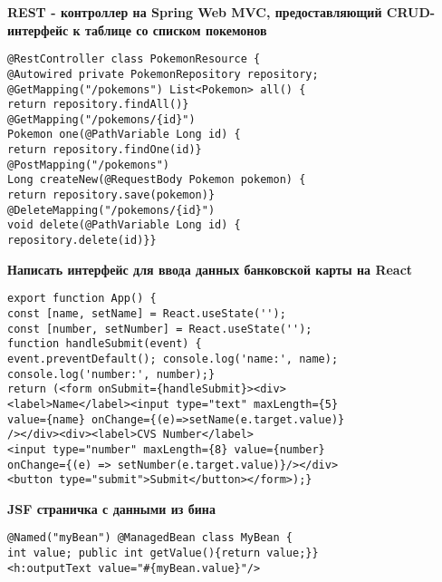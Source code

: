 \documentclass{article}
\begin{document}
\begin{minipage}[t]{0.3\textwidth}
    \textbf{REST - контроллер на Spring Web MVC, предоставляющий CRUD-интерфейс к таблице со списком покемонов}
    \begin{lstlisting}[frame=single, basicstyle=\tiny\ttfamily, breaklines=true, breakatwhitespace=true, postbreak=\mbox{\textcolor{red}{$\hookrightarrow$}\space}]
@RestController class PokemonResource {
@Autowired private PokemonRepository repository;
@GetMapping("/pokemons") List<Pokemon> all() {
return repository.findAll()}
@GetMapping("/pokemons/{id}")
Pokemon one(@PathVariable Long id) {
return repository.findOne(id)}
@PostMapping("/pokemons")
Long createNew(@RequestBody Pokemon pokemon) {
return repository.save(pokemon)}
@DeleteMapping("/pokemons/{id}")
void delete(@PathVariable Long id) {
repository.delete(id)}}
    \end{lstlisting}
\end{minipage}%
\hfill
\begin{minipage}[t]{0.3\textwidth}
    \textbf{Написать интерфейс для ввода данных банковской карты на React}
    \begin{lstlisting}[frame=single, basicstyle=\tiny\ttfamily, breaklines=true, breakatwhitespace=true, postbreak=\mbox{\textcolor{red}{$\hookrightarrow$}\space}]
export function App() {
const [name, setName] = React.useState('');
const [number, setNumber] = React.useState('');
function handleSubmit(event) {
event.preventDefault(); console.log('name:', name);
console.log('number:', number);}
return (<form onSubmit={handleSubmit}><div>
<label>Name</label><input type="text" maxLength={5}
value={name} onChange={(e)=>setName(e.target.value)}
/></div><div><label>CVS Number</label>
<input type="number" maxLength={8} value={number}
onChange={(e) => setNumber(e.target.value)}/></div>
<button type="submit">Submit</button></form>);}
    \end{lstlisting}
\end{minipage}%
\hfill
\begin{minipage}[t]{0.3\textwidth}
    \textbf{JSF страничка с данными из бина}
    \begin{lstlisting}[frame=single, basicstyle=\tiny\ttfamily, breaklines=true, breakatwhitespace=true, postbreak=\mbox{\textcolor{red}{$\hookrightarrow$}\space}]
@Named("myBean") @ManagedBean class MyBean {
int value; public int getValue(){return value;}}
<h:outputText value="#{myBean.value}"/>        
    \end{lstlisting}
\end{minipage}%
\\
\end{document}
